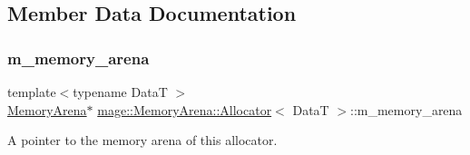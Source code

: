 \subsection{Member Data Documentation}
\hypertarget{structmage_1_1_memory_arena_1_1_allocator_aedfb429d9e7a6b59d9706183963c37ee}{}\label{structmage_1_1_memory_arena_1_1_allocator_aedfb429d9e7a6b59d9706183963c37ee} 
\subsubsection{\texorpdfstring{m\+\_\+memory\+\_\+arena}{m\_memory\_arena}}
{\footnotesize\ttfamily template$<$typename DataT $>$ \\
\hyperlink{classmage_1_1_memory_arena}{Memory\+Arena}$\ast$ \hyperlink{structmage_1_1_memory_arena_1_1_allocator}{mage\+::\+Memory\+Arena\+::\+Allocator}$<$ DataT $>$\+::m\+\_\+memory\+\_\+arena\hspace{0.3cm}{\ttfamily [private]}}

A pointer to the memory arena of this allocator. 